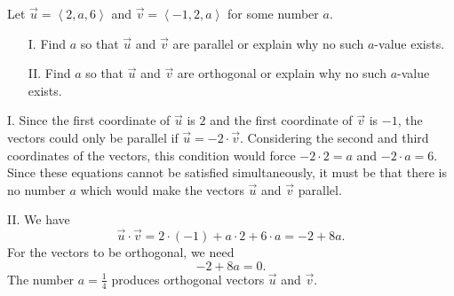 \documentclass[noauthor, handout]{ximera}
\begin{document}
\begin{problem}
Let $\vec{u} = \left<2,a,6\right>$ and $\vec{v} = \left<-1,2,a\right>$ for some number $a$. 
\begin{itemize}
\item[I.] Find $a$ so that $\vec{u}$ and $\vec{v}$ are parallel or explain why no such $a$-value exists.
\item[II.] Find $a$ so that $\vec{u}$ and $\vec{v}$ are orthogonal or explain why no such $a$-value exists.
\end{itemize}

\begin{freeResponse}
I. Since the first coordinate of $\vec{u}$ is $2$ and the first coordinate of $\vec{v}$ is $-1$, the vectors could only be parallel if $\vec{u} = -2 \cdot \vec{v}$. Considering the second and third coordinates of the vectors, this condition would force $-2 \cdot 2 = a$ and $-2 \cdot a = 6$. Since these equations cannot be satisfied simultaneously, it must be that there is no number $a$ which would make the vectors $\vec{u}$ and $\vec{v}$ parallel.

II. We have
$$
\vec{u} \cdot \vec{v} = 2 \cdot (-1) + a \cdot 2 + 6 \cdot a = -2 + 8a.
$$
For the vectors to be orthogonal, we need
$$
-2 + 8 a = 0.
$$
The number $a = \frac{1}{4}$ produces orthogonal vectors $\vec{u}$ and $\vec{v}$. 
\end{freeResponse}
\end{problem}

\end{document}
